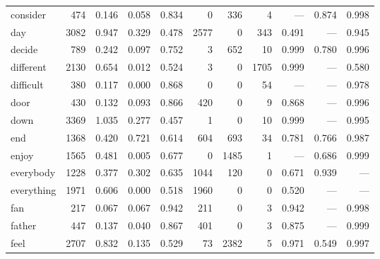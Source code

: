 \begin{landscape}
\begin{longtable}[c]{ l | r r c c | r r r | r r r }
  consider   & 474   & 0.146                   & 0.058           & 0.834      & 0         & 336         & 4            & —         & 0.874       & 0.998\\
  day        & 3082  & 0.947                   & 0.329           & 0.478      & 2577      & 0           & 343          & 0.491     & —           & 0.945\\
  decide     & 789   & 0.242                   & 0.097           & 0.752      & 3         & 652         & 10           & 0.999     & 0.780       & 0.996\\
  different  & 2130  & 0.654                   & 0.012           & 0.524      & 3         & 0           & 1705         & 0.999     & —           & 0.580\\
  difficult  & 380   & 0.117                   & 0.000           & 0.868      & 0         & 0           & 54           & —         & —           & 0.978\\
  door       & 430   & 0.132                   & 0.093           & 0.866      & 420       & 0           & 9            & 0.868     & —           & 0.996\\
  down       & 3369  & 1.035                   & 0.277           & 0.457      & 1         & 0           & 10           & 0.999     & —           & 0.995\\
  end        & 1368  & 0.420                   & 0.721           & 0.614      & 604       & 693         & 34           & 0.781     & 0.766       & 0.987\\
  enjoy      & 1565  & 0.481                   & 0.005           & 0.677      & 0         & 1485        & 1            & —         & 0.686       & 0.999\\
  everybody  & 1228  & 0.377                   & 0.302           & 0.635      & 1044      & 120         & 0            & 0.671     & 0.939       & —\\
  everything & 1971  & 0.606                   & 0.000           & 0.518      & 1960      & 0           & 0            & 0.520     & —           & —\\
  fan        & 217   & 0.067                   & 0.067           & 0.942      & 211       & 0           & 3            & 0.942     & —           & 0.998\\
  father     & 447   & 0.137                   & 0.040           & 0.867      & 401       & 0           & 3            & 0.875     & —           & 0.999\\
  feel       & 2707  & 0.832                   & 0.135           & 0.529      & 73        & 2382        & 5            & 0.971     & 0.549       & 0.997\\

\end{longtable}
\end{landscape}

